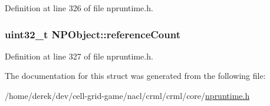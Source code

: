 Definition at line 326 of file npruntime.h.

\hypertarget{struct_n_p_object_a0f9e1d517ff19eebbdb732487a99bae2}{
\subsubsection[{referenceCount}]{\setlength{\rightskip}{0pt plus 5cm}uint32\_\-t {\bf NPObject::referenceCount}}}
\label{struct_n_p_object_a0f9e1d517ff19eebbdb732487a99bae2}


Definition at line 327 of file npruntime.h.



The documentation for this struct was generated from the following file:\begin{DoxyCompactItemize}
\item 
/home/derek/dev/cell-\/grid-\/game/nacl/crml/crml/core/\hyperlink{npruntime_8h}{npruntime.h}\end{DoxyCompactItemize}
